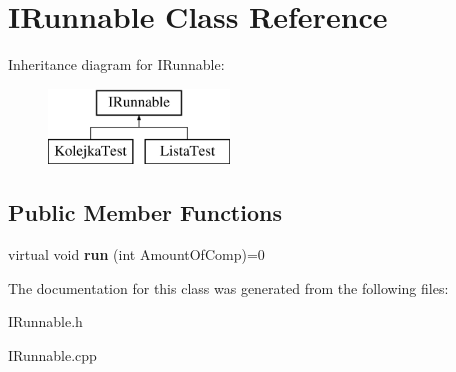 \hypertarget{class_i_runnable}{\section{I\-Runnable Class Reference}
\label{class_i_runnable}
}
Inheritance diagram for I\-Runnable\-:\begin{figure}[H]
\begin{center}
\leavevmode
\includegraphics[height=2.000000cm]{class_i_runnable}
\end{center}
\end{figure}
\subsection*{Public Member Functions}
\begin{DoxyCompactItemize}
\item 
\hypertarget{class_i_runnable_ad830df095945f75563d27c2ee8bae0f5}{virtual void {\bfseries run} (int Amount\-Of\-Comp)=0}\label{class_i_runnable_ad830df095945f75563d27c2ee8bae0f5}

\end{DoxyCompactItemize}


The documentation for this class was generated from the following files\-:\begin{DoxyCompactItemize}
\item 
I\-Runnable.\-h\item 
I\-Runnable.\-cpp\end{DoxyCompactItemize}
